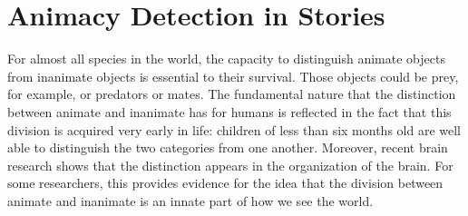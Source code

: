 \section{Animacy Detection in Stories}\label{sec:animacy}

For almost all species in the world, the capacity to distinguish animate objects from inanimate objects is essential to their survival. Those objects could be prey, for example, or predators or mates. The fundamental nature that the distinction between animate and inanimate has for humans is reflected in the fact that this division is acquired very early in life: children of less than six months old are well able to distinguish the two categories from one another\autocite{opfer:2002}. Moreover, recent brain research shows that the distinction appears in the organization of the brain\autocite{gao:2012}. For some researchers, this provides evidence for the idea that the division between animate and inanimate is an innate part of how we see the world.

